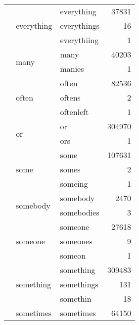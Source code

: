 \begin{longtable}[ht]{lllr}
\cline{2-4}
 & \multirow[c]{3}{*}{everything} & everything & {\cellcolor[HTML]{EDF8B2}} \color[HTML]{000000} 37831 \\
 &  & everythings & {\cellcolor[HTML]{FFFFD9}} \color[HTML]{000000} 16 \\
 &  & everythiing & {\cellcolor[HTML]{FFFFD9}} \color[HTML]{000000} 1 \\
\cline{2-4}
 & \multirow[c]{2}{*}{many} & many & {\cellcolor[HTML]{ECF7B1}} \color[HTML]{000000} 40203 \\
 &  & manies & {\cellcolor[HTML]{FFFFD9}} \color[HTML]{000000} 1 \\
\cline{2-4}
 & \multirow[c]{3}{*}{often} & often & {\cellcolor[HTML]{BDE5B5}} \color[HTML]{000000} 82536 \\
 &  & oftens & {\cellcolor[HTML]{FFFFD9}} \color[HTML]{000000} 2 \\
 &  & oftenleft & {\cellcolor[HTML]{FFFFD9}} \color[HTML]{000000} 1 \\
\cline{2-4}
 & \multirow[c]{2}{*}{or} & or & {\cellcolor[HTML]{0B1F5E}} \color[HTML]{F1F1F1} 304970 \\
 &  & ors & {\cellcolor[HTML]{FFFFD9}} \color[HTML]{000000} 1 \\
\cline{2-4}
 & \multirow[c]{3}{*}{some} & some & {\cellcolor[HTML]{8ED3BA}} \color[HTML]{000000} 107631 \\
 &  & somes & {\cellcolor[HTML]{FFFFD9}} \color[HTML]{000000} 2 \\
 &  & someing & {\cellcolor[HTML]{FFFFD9}} \color[HTML]{000000} 1 \\
\cline{2-4}
 & \multirow[c]{2}{*}{somebody} & somebody & {\cellcolor[HTML]{FEFFD6}} \color[HTML]{000000} 2470 \\
 &  & somebodies & {\cellcolor[HTML]{FFFFD9}} \color[HTML]{000000} 3 \\
\cline{2-4}
 & \multirow[c]{3}{*}{someone} & someone & {\cellcolor[HTML]{F3FABD}} \color[HTML]{000000} 27618 \\
 &  & someones & {\cellcolor[HTML]{FFFFD9}} \color[HTML]{000000} 9 \\
 &  & someon & {\cellcolor[HTML]{FFFFD9}} \color[HTML]{000000} 1 \\
\cline{2-4}
 & \multirow[c]{3}{*}{something} & something & {\cellcolor[HTML]{081D58}} \color[HTML]{F1F1F1} 309483 \\
 &  & somethings & {\cellcolor[HTML]{FFFFD9}} \color[HTML]{000000} 131 \\
 &  & somethin & {\cellcolor[HTML]{FFFFD9}} \color[HTML]{000000} 18 \\
\cline{2-4}
 & sometimes & sometimes & {\cellcolor[HTML]{D4EEB3}} \color[HTML]{000000} 64150 \\
\cline{1-4} \cline{2-4}
\end{longtable}

